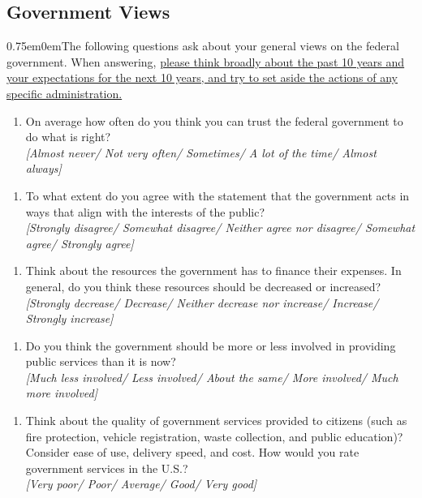 \documentclass[11pt]{article}
\begin{document}
\subsection*{Government Views}

\begin{adjustwidth}{0.75em}{0em}The following questions ask about your general views on the federal government. When answering, \uline{please think broadly about the past 10 years and your expectations for the next 10 years, and try to set aside the actions of any specific administration.}\end{adjustwidth}
\begin{enumerate}[resume]
    \item On average how often do you think you can trust the federal government to do what is right? \\ \textit{[Almost never/ Not very often/ Sometimes/ A lot of the time/ Almost always]} 
\end{enumerate}
\begin{enumerate}[resume]
    \item To what extent do you agree with the statement that the government acts in ways that align with the interests of the public?\\
    \textit{[Strongly disagree/ Somewhat disagree/ Neither agree nor disagree/ Somewhat agree/ Strongly agree]}
\end{enumerate}
\begin{enumerate} [resume]
    \item Think about the resources the government has to finance their expenses. In general, do you think these resources should be decreased or increased? \\ 
    \textit{[Strongly decrease/ Decrease/ Neither decrease nor increase/ Increase/ Strongly increase]} 
\end{enumerate}
\begin{enumerate}[resume]
    \item Do you think the government should be more or less involved in providing public services than it is now? \\
    \textit{[Much less involved/ Less involved/ About the same/ More involved/ Much more involved]}
\end{enumerate}
\begin{enumerate}[resume]
    \item Think about the quality of government services provided to citizens (such as fire protection, vehicle registration, waste collection, and public education)? Consider ease of use, delivery speed, and cost. How would you rate government services in the U.S.? \\
    \textit{[Very poor/ Poor/ Average/ Good/ Very good]}
\end{enumerate}
\end{document}
